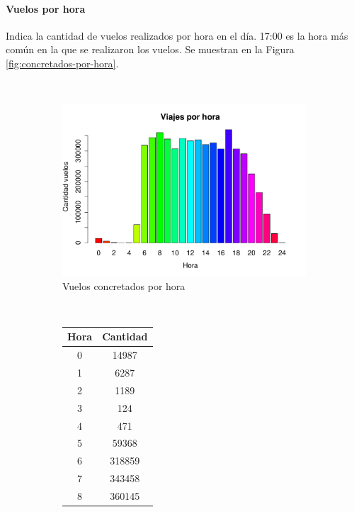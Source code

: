 \documentclass[12pt]{article}
\numberwithin{equation}{section}
\numberwithin{table}{section}
\numberwithin{figure}{section}
\begin{document}
\paragraph{Vuelos por hora}
Indica la cantidad de vuelos realizados por hora en el día.
17:00 es la hora más común en la que se realizaron los vuelos.
Se muestran en la Figura \ref{fig:concretados-por-hora}.

\begin{figure}
        \centering
        ~
        \begin{subfigure}[b]{0.6\textwidth}
                \includegraphics[width=1\columnwidth]{imagenes/completos/viajes-por-hora}
                \caption{Vuelos concretados por hora}
        \end{subfigure}
        ~
        \begin{subfigure}[b]{0.3\textwidth}
\begin{tabular}{@{}cc@{}}
\toprule
\textbf{Hora} & \textbf{Cantidad} \\ \midrule
0             & 14987             \\
1             & 6287              \\
2             & 1189              \\
3             & 124               \\
4             & 471               \\
5             & 59368             \\
6             & 318859            \\
7             & 343458            \\
8             & 360145            \\

\end{tabular}
\end{subfigure}
\end{figure}
\end{document}
